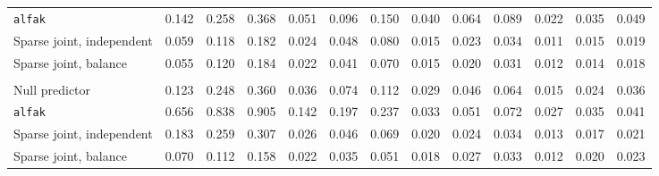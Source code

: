 \begin{center}
\begin{tabular}{l*{12}{r}}
\quad \texttt{alfak} & 0.142 & 0.258 & 0.368 & 0.051 & 0.096 & 0.150 & 0.040 & 0.064 & 0.089 & 0.022 & 0.035 & 0.049 \\
\quad Sparse joint, independent & 0.059 & 0.118 & 0.182 & 0.024 & 0.048 & 0.080 & 0.015 & 0.023 & 0.034 & 0.011 & 0.015 & 0.019 \\
\quad Sparse joint, balance & 0.055 & 0.120 & 0.184 & 0.022 & 0.041 & 0.070 & 0.015 & 0.020 & 0.031 & 0.012 & 0.014 & 0.018 \\
\addlinespace[2pt]
\multicolumn{13}{l}{\textit{3000/100, 360 d}} \\
\quad Null predictor & 0.123 & 0.248 & 0.360 & 0.036 & 0.074 & 0.112 & 0.029 & 0.046 & 0.064 & 0.015 & 0.024 & 0.036 \\
\quad \texttt{alfak} & 0.656 & 0.838 & 0.905 & 0.142 & 0.197 & 0.237 & 0.033 & 0.051 & 0.072 & 0.027 & 0.035 & 0.041 \\
\quad Sparse joint, independent & 0.183 & 0.259 & 0.307 & 0.026 & 0.046 & 0.069 & 0.020 & 0.024 & 0.034 & 0.013 & 0.017 & 0.021 \\
\quad Sparse joint, balance & 0.070 & 0.112 & 0.158 & 0.022 & 0.035 & 0.051 & 0.018 & 0.027 & 0.033 & 0.012 & 0.020 & 0.023 \\
\bottomrule
\end{tabular}
\end{center}

